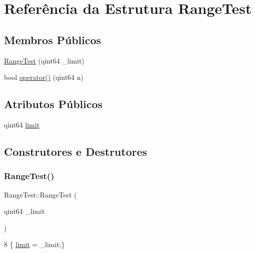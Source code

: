 \hypertarget{struct_range_test}{}\section{Referência da Estrutura Range\+Test}
\label{struct_range_test}
\subsection*{Membros Públicos}
\begin{DoxyCompactItemize}
\item 
\mbox{\hyperlink{struct_range_test_a9d96f82c111ffd4d2747416b90306791}{Range\+Test}} (qint64 \+\_\+limit)
\item 
bool \mbox{\hyperlink{struct_range_test_add496768a566e04219e840ee25e829d7}{operator()}} (qint64 n)
\end{DoxyCompactItemize}
\subsection*{Atributos Públicos}
\begin{DoxyCompactItemize}
\item 
qint64 \mbox{\hyperlink{struct_range_test_a638ebd61c0447db219f10cd1473ab364}{limit}}
\end{DoxyCompactItemize}


\subsection{Construtores e Destrutores}
\mbox{\label{struct_range_test_a9d96f82c111ffd4d2747416b90306791}} 
\subsubsection{\texorpdfstring{Range\+Test()}{RangeTest()}}
{\footnotesize\ttfamily Range\+Test\+::\+Range\+Test (\begin{DoxyParamCaption}\item[{qint64}]{\+\_\+limit }\end{DoxyParamCaption})\hspace{0.3cm}{\ttfamily [inline]}}


\begin{DoxyCode}
8 \{ \mbox{\hyperlink{struct_range_test_a638ebd61c0447db219f10cd1473ab364}{limit}} = \_limit;\}
\end{DoxyCode}


